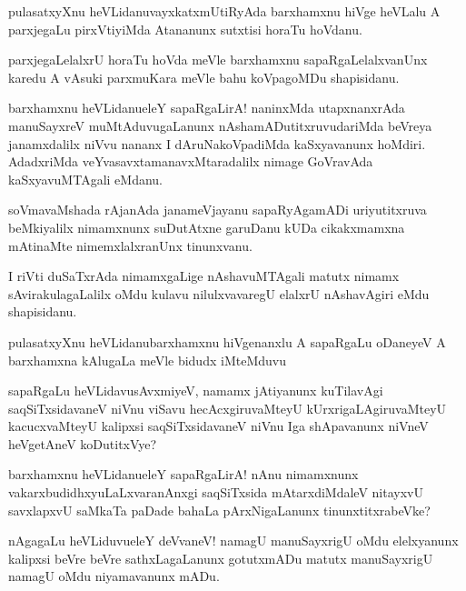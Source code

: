 \begin{mng}
pulasatxyXnu heVLidanu\mdash vayxkatxmUtiRyAda barxhamxnu hiVge heVLalu A parxjegaLu pirxVtiyiMda Atananunx sutxtisi horaTu hoVdanu.
\end{mng}

\begin{mng}
parxjegaLelalxrU horaTu hoVda meVle barxhamxnu sapaRgaLelalxvanUnx karedu A vAsuki parxmuKara meVle bahu koVpagoMDu shapisidanu.
\end{mng}

\begin{mng}
barxhamxnu heVLidanu\mdash eleY sapaRgaLirA! naninxMda utapxnanxrAda manuSayxreV muMtAduvugaLanunx nAshamADutitxruvudariMda beVreya janamxdalilx niVvu nananx I dAruNakoVpadiMda kaSxyavanunx hoMdiri. AdadxriMda veYvasavxtamanavxMtaradalilx nimage GoVravAda kaSxyavuMTAgali eMdanu.
\end{mng}

\begin{mng}
soVmavaMshada rAjanAda janameVjayanu sapaRyAgamADi uriyutitxruva beMkiyalilx nimamxnunx suDutAtxne garuDanu kUDa cikakxmamxna mAtinaMte nimemxlalxranUnx tinunxvanu.
\end{mng}

\begin{mng}
I riVti duSaTxrAda nimamxgaLige nAshavuMTAgali matutx nimamx sAvirakulagaLalilx oMdu kulavu nilulxvavaregU elalxrU nAshavAgiri eMdu shapisidanu.
\end{mng}

\begin{mng}
pulasatxyXnu heVLidanu\mdash barxhamxnu hiVgenanxlu A sapaRgaLu oDaneyeV A barxhamxna kAlugaLa meVle bidudx iMteMduvu
\end{mng}

\begin{mng}
sapaRgaLu heVLidavu\mdash sAvxmiyeV, namamx jAtiyanunx kuTilavAgi saqSiTxsidavaneV niVnu viSavu hecAcxgiruvaMteyU kUrxrigaLAgiruvaMteyU kacucxvaMteyU kalipxsi saqSiTxsidavaneV niVnu Iga shApavanunx niVneV heVgetAneV koDutitxVye?
\end{mng}

\begin{mng}
barxhamxnu heVLidanu\mdash eleY sapaRgaLirA! nAnu nimamxnunx vakarxbudidhxyuLaLxvaranAnxgi saqSiTxsida mAtarxdiMdaleV nitayxvU savxlapxvU saMkaTa paDade bahaLa pArxNigaLanunx tinunxtitxrabeVke?
\end{mng}

\begin{mng}
nAgagaLu heVLiduvu\mdash eleY deVvaneV! namagU manuSayxrigU oMdu elelxyanunx kalipxsi beVre beVre sathxLagaLanunx gotutxmADu matutx manuSayxrigU namagU oMdu niyamavanunx mADu.
\end{mng}

